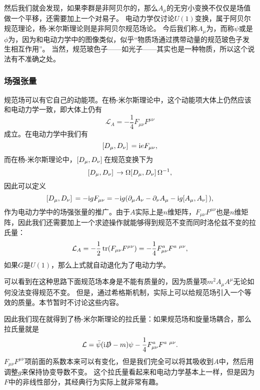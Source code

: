 然后我们就会发现，如果李群是非阿贝尔的，那么$A_\mu$的无穷小变换不仅仅是场值做一个平移，还需要加上一个对易子。
电动力学仅讨论$U(1)$变换，属于阿贝尔规范理论，杨-米尔斯理论则是非阿贝尔规范场论。
今后我们称$A_\mu$为，而称$\psi$或是$\phi$为，因为和电动力学中的图像类似，似乎“物质场通过携带动量的规范玻色子发生相互作用”。
当然，规范玻色子——如光子——其实也是一种物质，所以这个说法有不准确之处。

\subsubsection{场强张量}

规范场可以有它自己的动能项。在杨-米尔斯理论中，这个动能项大体上仍然应该和电动力学一致，即大体上仍有
\[
    \mathcal{L}_A = - \frac{1}{4} F_{\mu \nu} F^{\mu \nu}
\]
成立。在电动力学中我们有
\[
    \comm*{D_\mu}{D_\nu} = \ii e F_{\mu \nu},
\]
而在杨-米尔斯理论中，$\comm*{D_\mu}{D_\nu}$在规范变换下为
\[
    \comm*{D_\mu}{D_\nu} \to \Omega \comm*{D_\mu}{D_\nu} \Omega^{-1},
\]
因此可以定义
\begin{equation}
    \comm*{D_\mu}{D_\nu} = - \ii g F_{\mu \nu} = - \ii g (\partial_\mu A_\nu - \partial_\nu A_\mu - \ii g \comm*{A_\mu}{A_\nu}),
\end{equation}
作为电动力学中的场强张量的推广。由于$A$实际上是$n$维矩阵，$F_{\mu \nu} F^{\mu \nu}$也是$n$维矩阵，因此我们还需要加上一个求迹操作就能够得到规范不变而同时洛伦兹不变的拉氏量：
\begin{equation}
    \mathcal{L}_A = - \frac{1}{2} \trace(F_{\mu \nu} F^{\mu \nu}) = - \frac{1}{4} F_{\mu \nu}^a F^{a \ \mu \nu},
\end{equation}
如果$G$是$U(1)$，那么上式就自动退化为了电动力学。

可以看到在这种思路下面规范场本身是不能有质量的，因为质量项$m^2 A_\mu A^\mu$无论如何没法变得规范不变。
但是，通过希格斯机制，实际上可以给规范场引入一个等效的质量。本节暂时不讨论这些内容。

因此我们现在就得到了杨-米尔斯理论的拉氏量：如果规范场和旋量场耦合，那么拉氏量就是
\begin{equation}
    \mathcal{L} = \bar{\psi} (\mathrm{i} \slashed{D} - m) \psi - \frac{1}{4} F_{\mu \nu}^a F^{a \ \mu \nu}.
    \label{eq:yang-mills-lagrangian}
\end{equation}
$F_{\mu \nu} F^{\mu \nu}$项前面的系数本来可以有变化，但是我们完全可以将其吸收到$A$中，然后用调整$g$来保持协变导数不变。
这个拉氏量看起来和电动力学基本上一样，但是因为$F$中的非线性部分，其经典行为实际上就非常有趣。

